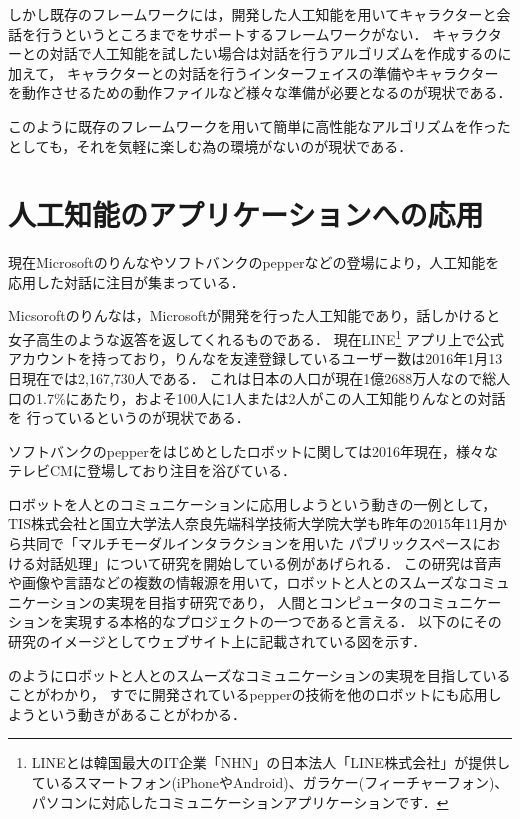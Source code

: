 しかし既存のフレームワークには，開発した人工知能を用いてキャラクターと会話を行うというところまでをサポートするフレームワークがない．
キャラクターとの対話で人工知能を試したい場合は対話を行うアルゴリズムを作成するのに加えて，
キャラクターとの対話を行うインターフェイスの準備やキャラクターを動作させるための動作ファイルなど様々な準備が必要となるのが現状である．

このように既存のフレームワークを用いて簡単に高性能なアルゴリズムを作ったとしても，それを気軽に楽しむ為の環境がないのが現状である．

\section{人工知能のアプリケーションへの応用}
現在Microsoftのりんな\cite{rinna}やソフトバンクのpepper\cite{pepper}などの登場により，人工知能を応用した対話に注目が集まっている．

Micsoroftのりんなは，Microsoftが開発を行った人工知能であり，話しかけると女子高生のような返答を返してくれるものである．
現在LINE\footnote{LINEとは韓国最大のIT企業「NHN」の日本法人「LINE株式会社」が提供しているスマートフォン(iPhoneやAndroid)、ガラケー(フィーチャーフォン)、パソコンに対応したコミュニケーションアプリケーションです．\cite{line}}
アプリ上で公式アカウントを持っており，りんなを友達登録しているユーザー数は2016年1月13日現在では2,167,730人である．
これは日本の人口が現在1億2688万人\cite{humen}なので総人口の1.7\%にあたり，およそ100人に1人または2人がこの人工知能りんなとの対話を
行っているというのが現状である．

ソフトバンクのpepperをはじめとしたロボットに関しては2016年現在，様々なテレビCMに登場しており注目を浴びている．

ロボットを人とのコミュニケーションに応用しようという動きの一例として，
TIS株式会社と国立大学法人奈良先端科学技術大学院大学も昨年の2015年11月から共同で「マルチモーダルインタラクションを用いた
パブリックスペースにおける対話処理」について研究を開始している例があげられる．\cite{tis}
この研究は音声や画像や言語などの複数の情報源を用いて，ロボットと人とのスムーズなコミュニケーションの実現を目指す研究であり，
人間とコンピュータのコミュニケーションを実現する本格的なプロジェクトの一つであると言える．
以下のにその研究のイメージとしてウェブサイト上に記載されている図を示す．


のようにロボットと人とのスムーズなコミュニケーションの実現を目指していることがわかり，
すでに開発されているpepperの技術を他のロボットにも応用しようという動きがあることがわかる．

